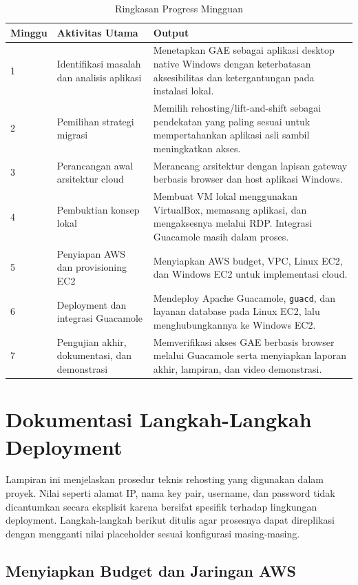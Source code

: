 \documentclass[conference]{IEEEtran}
\begin{document}
\begin{table}[!h]
\centering
\caption{Ringkasan Progress Mingguan}
\label{tab:weekly}
\begin{tabularx}{\textwidth}{p{0.8cm}p{3.5cm}X}
\toprule
\textbf{Minggu} & \textbf{Aktivitas Utama} & \textbf{Output} \\
\midrule
1 & Identifikasi masalah dan analisis aplikasi & Menetapkan GAE sebagai aplikasi desktop native Windows dengan keterbatasan aksesibilitas dan ketergantungan pada instalasi lokal. \\
2 & Pemilihan strategi migrasi & Memilih rehosting/lift-and-shift sebagai pendekatan yang paling sesuai untuk mempertahankan aplikasi asli sambil meningkatkan akses. \\
3 & Perancangan awal arsitektur cloud & Merancang arsitektur dengan lapisan gateway berbasis browser dan host aplikasi Windows. \\
4 & Pembuktian konsep lokal & Membuat VM lokal menggunakan VirtualBox, memasang aplikasi, dan mengaksesnya melalui RDP. Integrasi Guacamole masih dalam proses. \\
5 & Penyiapan AWS dan provisioning EC2 & Menyiapkan AWS budget, VPC, Linux EC2, dan Windows EC2 untuk implementasi cloud. \\
6 & Deployment dan integrasi Guacamole & Mendeploy Apache Guacamole, \texttt{guacd}, dan layanan database pada Linux EC2, lalu menghubungkannya ke Windows EC2. \\
7 & Pengujian akhir, dokumentasi, dan demonstrasi & Memverifikasi akses GAE berbasis browser melalui Guacamole serta menyiapkan laporan akhir, lampiran, dan video demonstrasi. \\
\bottomrule
\end{tabularx}
\end{table}

\section{Dokumentasi Langkah-Langkah Deployment}

Lampiran ini menjelaskan prosedur teknis rehosting yang digunakan dalam proyek. Nilai seperti alamat IP, nama key pair, username, dan password tidak dicantumkan secara eksplisit karena bersifat spesifik terhadap lingkungan deployment. Langkah-langkah berikut ditulis agar prosesnya dapat direplikasi dengan mengganti nilai placeholder sesuai konfigurasi masing-masing.

\subsection{Menyiapkan Budget dan Jaringan AWS}
\end{document}
